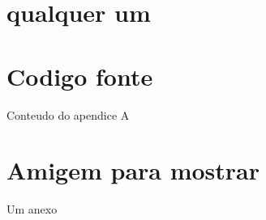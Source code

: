 \documentclass[12pt,twoside,oneright,a4paper,chapter=TITLE,english,brazil]{unipampa}
\begin{document}
    \chapter{qualquer um}


        
\postextual     %


 
 
\apendices                      %

\chapter{Codigo fonte}
    Conteudo do apendice A


\anexos                         %

\chapter{Amigem para mostrar}
    Um anexo

    
%
\printindex             %
\end{document}
